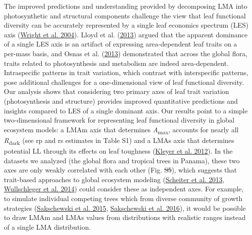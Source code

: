 \documentclass[
  12pt,
  a4paper,
,tablecaptionabove
]{scrartcl}
\providecommand{\DIFaddtex}[1]{{\protect\color{blue}\uwave{#1}}} %
\providecommand{\DIFdeltex}[1]{{\protect\color{red}\sout{#1}}}                      %
\providecommand{\DIFaddbegin}{} %
\providecommand{\DIFaddend}{} %
\providecommand{\DIFdelbegin}{} %
\providecommand{\DIFdelend}{} %
\providecommand{\DIFadd}[1]{\texorpdfstring{\DIFaddtex{#1}}{#1}} %
\providecommand{\DIFdel}[1]{\texorpdfstring{\DIFdeltex{#1}}{}} %
\newcommand{\DIFscaledelfig}{0.5}
\newlength{\DIFdelgraphicswidth} %
\newlength{\DIFdelgraphicsheight} %
\newcommand{\DIFaddincludegraphics}[2][]{{\color{blue}\fbox{\DIFOincludegraphics[#1]{#2}}}} %
\newcommand{\DIFdelincludegraphics}[2][]{%
\sbox{\DIFdelgraphicsbox}{\DIFOincludegraphics[#1]{#2}}%
\settoboxwidth{\DIFdelgraphicswidth}{\DIFdelgraphicsbox} %
\settoboxtotalheight{\DIFdelgraphicsheight}{\DIFdelgraphicsbox} %
\scalebox{\DIFscaledelfig}{%
\parbox[b]{\DIFdelgraphicswidth}{\usebox{\DIFdelgraphicsbox}\\[-\baselineskip] \rule{\DIFdelgraphicswidth}{0em}}\llap{\resizebox{\DIFdelgraphicswidth}{\DIFdelgraphicsheight}{%
\setlength{\unitlength}{\DIFdelgraphicswidth}%
\begin{picture}(1,1)%
\thicklines\linethickness{2pt} %
{\color[rgb]{1,0,0}\put(0,0){\framebox(1,1){}}}%
{\color[rgb]{1,0,0}\put(0,0){\line( 1,1){1}}}%
{\color[rgb]{1,0,0}\put(0,1){\line(1,-1){1}}}%
\end{picture}%
}\hspace*{3pt}}} %
} %
\DeclareRobustCommand{\DIFaddbegin}{\DIFOaddbegin \let\includegraphics\DIFaddincludegraphics} %
\DeclareRobustCommand{\DIFaddend}{\DIFOaddend \let\includegraphics\DIFOincludegraphics} %
\DeclareRobustCommand{\DIFdelbegin}{\DIFOdelbegin \let\includegraphics\DIFdelincludegraphics} %
\DeclareRobustCommand{\DIFdelend}{\DIFOaddend \let\includegraphics\DIFOincludegraphics} %
\begin{document}
The improved predictions and understanding provided by decomposing LMA
into photosynthetic and structural components challenge the view that
leaf functional diversity can be accurately represented by a single leaf
economics spectrum (LES) axis
(\protect\hyperlink{ref-Wright2004a}{Wright et al. 2004}). Lloyd et al.
(\protect\hyperlink{ref-Lloyd2013}{2013}) argued that the apparent
dominance of a single LES axis is an artifact of expressing
area-dependent leaf traits on a per-mass basis, and Osnas et al.
(\protect\hyperlink{ref-Osnas2013}{2013}) demonstrated that across the
global flora, traits related to photosynthesis and metabolism are indeed
area-dependent. Intraspecific patterns in trait variation, which
contrast with interspecific patterns, pose additional challenges for a
one-dimensional view of leaf functional diversity. Our analysis shows
that considering two primary axes of leaf trait variation
(photosynthesis and structure) provides improved quantitative
predictions and insights compared to LES of a single dominant axis. Our
results point to a simple two-dimensional framework for representing
leaf functional diversity in global ecosystem models: a LMAm axis that
determines \emph{A}\textsubscript{max}, accounts for nearly all
\emph{R}\textsubscript{dark} (see rp and rs estimates in Table S1) and a
LMAs axis that determines potential LL through its effects on leaf
toughness (\protect\hyperlink{ref-Kleyer2012}{Kleyer et al. 2012}). In
the datasets we analyzed (the global flora and tropical trees in
Panama), these two axes are only weakly correlated with each other (Fig.
\DIFdelbegin \DIFdel{S5}\DIFdelend \DIFaddbegin \DIFadd{S\ref{fig-LMAm_LMAs}}\DIFaddend ), which suggests that trait-based approaches to
global ecosystem modeling (\protect\hyperlink{ref-Scheiter2013}{Scheiter
et al. 2013}, \protect\hyperlink{ref-Wullschleger2014}{Wullschleger et
al. 2014}) could consider these as independent axes. For example, to
simulate individual competing trees which from diverse community of
growth strategies (\protect\hyperlink{ref-Sakschewski2015}{Sakschewski
et al. 2015}, \protect\hyperlink{ref-Sakschewski2016}{Sakschewski et al.
2016}), it would be possible to draw LMAm and LMAs values from
distributions with realistic ranges instead of a single LMA
distribution.
\end{document}
